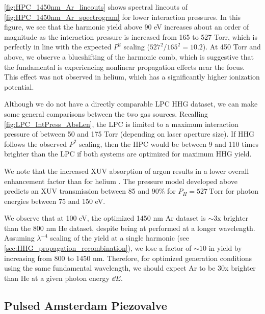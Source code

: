 \cref{fig:HPC_1450nm_Ar_lineouts} shows spectral lineouts of \cref{fig:HPC_1450nm_Ar_spectrogram} for lower interaction pressures. In this figure, we see that the harmonic yield above 90 eV increases about an order of magnitude as the interaction pressure is increased from 165 to 527 Torr, which is perfectly in line with the expected $P^2$ scaling ($527^2/165^2 = 10.2$). At 450 Torr and above, we observe a blueshifting of the harmonic comb, which is suggestive that the fundamental is experiencing nonlinear propagation effects near the focus. This effect was not observed in helium, which has a significantly higher ionization potential.

Although we do not have a directly comparable LPC HHG dataset, we can make some general comparisons between the two gas sources. Recalling \cref{fig:LPC_IntPress_AbsLen}, the LPC is limited to a maximum interaction pressure of between 50 and 175 Torr (depending on laser aperture size). If HHG follows the observed $P^2$ scaling, then the HPC would be between 9 and 110 times brighter than the LPC if both systems are optimized for maximum HHG yield.

We note that the increased XUV absorption of argon results in a lower overall enhancement factor than for helium \cite{popmintchevPhaseMatchingHigh2009}. The pressure model developed above predicts an XUV transmission between 85 and 90\% for $P_H = 527 \ \textrm{Torr}$ for photon energies between 75 and 150 eV.

We observe that at 100 eV, the optimized 1450 nm Ar dataset is $\sim 3\textrm{x}$ brighter than the 800 nm He dataset, despite being at performed at a longer wavelength. Assuming $\lambda^{-4}$ scaling of the yield at a single harmonic (see \cref{sec:HHG_propagation_recombination}), we lose a factor of $\sim 10$ in yield by increasing from 800 to 1450 nm. Therefore, for optimized generation conditions using the same fundamental wavelength, we should expect Ar to be 30x brighter than He at a given photon energy $\dd E$.


\subsection{Pulsed Amsterdam Piezovalve}

